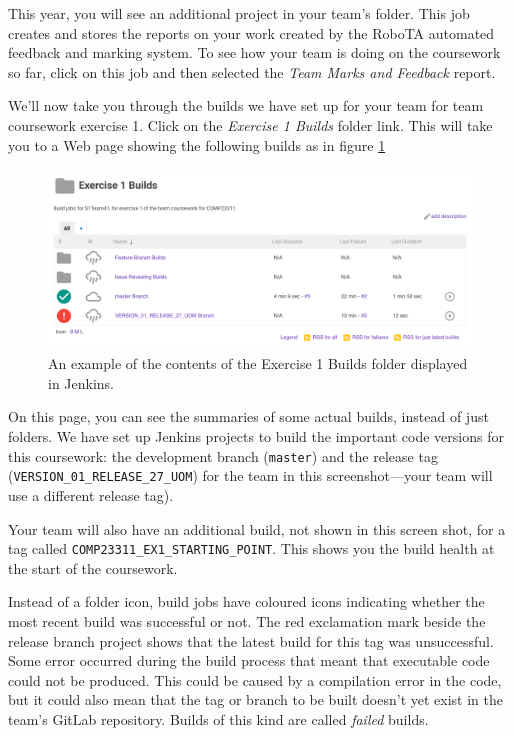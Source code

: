 \documentclass[
]{book}
\begin{document}
This year, you will see an additional project in your team's folder. This job creates and stores the reports on your work created by the RoboTA automated feedback and marking system. To see how your team is doing on the coursework so far, click on this job and then selected the \emph{Team Marks and Feedback} report.

We'll now take you through the builds we have set up for your team for team coursework exercise 1. Click on the \emph{Exercise 1 Builds} folder link. This will take you to a Web page showing the following builds as in figure \ref{fig:contentsOfExercise1FolderOnJenkins-fig}

\begin{figure}

{\centering \includegraphics[width=1\linewidth]{images/contentsOfExercise1FolderOnJenkins} 

}

\caption{An example of the contents of the Exercise 1 Builds folder displayed in Jenkins.}\label{fig:contentsOfExercise1FolderOnJenkins-fig}
\end{figure}

On this page, you can see the summaries of some actual builds, instead of just folders. We have set up Jenkins projects to build the important code versions for this coursework: the development branch (\texttt{master}) and the release tag (\texttt{VERSION\_01\_RELEASE\_27\_UOM}) for the team in this screenshot---your team will use a different release tag).

Your team will also have an additional build, not shown in this screen shot, for a tag called \texttt{COMP23311\_EX1\_STARTING\_POINT}. This shows you the build health at the start of the coursework.

Instead of a folder icon, build jobs have coloured icons indicating whether the most recent build was successful or not. The red exclamation mark beside the release branch project shows that the latest build for this tag was unsuccessful. Some error occurred during the build process that meant that executable code could not be produced. This could be caused by a compilation error in the code, but it could also mean that the tag or branch to be built doesn't yet exist in the team's GitLab repository. Builds of this kind are called \emph{failed} builds.
\end{document}
